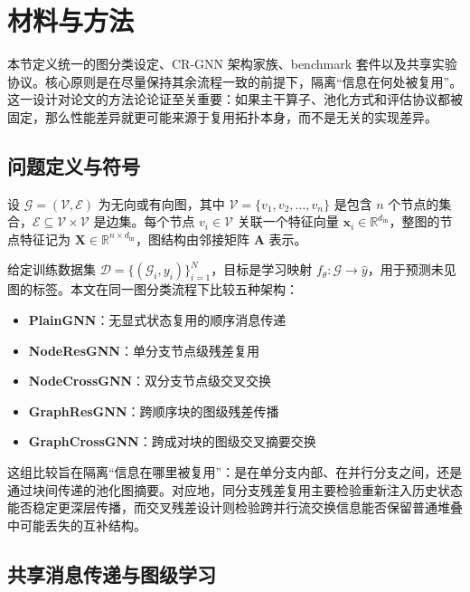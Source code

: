 \section{材料与方法}
\label{sec:methods}

本节定义统一的图分类设定、CR-GNN 架构家族、benchmark 套件以及共享实验协议。核心原则是在尽量保持其余流程一致的前提下，隔离“信息在何处被复用”。这一设计对论文的方法论论证至关重要：如果主干算子、池化方式和评估协议都被固定，那么性能差异就更可能来源于复用拓扑本身，而不是无关的实现差异。

\subsection{问题定义与符号}

设 $\mathcal{G} = (\mathcal{V}, \mathcal{E})$ 为无向或有向图，其中 $\mathcal{V} = \{v_1, v_2, \ldots, v_n\}$ 是包含 $n$ 个节点的集合，$\mathcal{E} \subseteq \mathcal{V} \times \mathcal{V}$ 是边集。每个节点 $v_i \in \mathcal{V}$ 关联一个特征向量 $\mathbf{x}_i \in \mathbb{R}^{d_{\text{in}}}$，整图的节点特征记为 $\mathbf{X} \in \mathbb{R}^{n \times d_{\text{in}}}$，图结构由邻接矩阵 $\mathbf{A}$ 表示。

给定训练数据集 $\mathcal{D} = \{(\mathcal{G}_i, y_i)\}_{i=1}^{N}$，目标是学习映射 $f_\theta: \mathcal{G} \rightarrow \hat{y}$，用于预测未见图的标签。本文在同一图分类流程下比较五种架构：
\begin{itemize}
    \item \textbf{PlainGNN}：无显式状态复用的顺序消息传递
    \item \textbf{NodeResGNN}：单分支节点级残差复用
    \item \textbf{NodeCrossGNN}：双分支节点级交叉交换
    \item \textbf{GraphResGNN}：跨顺序块的图级残差传播
    \item \textbf{GraphCrossGNN}：跨成对块的图级交叉摘要交换
\end{itemize}

这组比较旨在隔离“信息在哪里被复用”：是在单分支内部、在并行分支之间，还是通过块间传递的池化图摘要。对应地，同分支残差复用主要检验重新注入历史状态能否稳定更深层传播，而交叉残差设计则检验跨并行流交换信息能否保留普通堆叠中可能丢失的互补结构。

\subsection{共享消息传递与图级学习}

